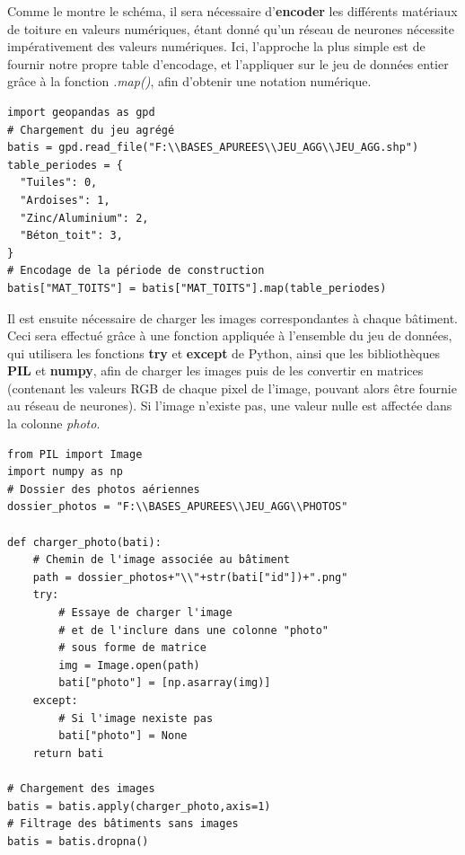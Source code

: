 \documentclass[
  11pt,
  french,
]{article}
\begin{document}
Comme le montre le schéma, il sera nécessaire d'\textbf{encoder} les
différents matériaux de toiture en valeurs numériques, étant donné qu'un
réseau de neurones nécessite impérativement des valeurs numériques. Ici,
l'approche la plus simple est de fournir notre propre table d'encodage,
et l'appliquer sur le jeu de données entier grâce à la fonction
\emph{.map()}, afin d'obtenir une notation numérique.

\begin{tcolorbox}[title= Encodage des matériaux de toiture ,colback=boitecode]
\begin{lstlisting}[style=code]
import geopandas as gpd
# Chargement du jeu agrégé
batis = gpd.read_file("F:\\BASES_APUREES\\JEU_AGG\\JEU_AGG.shp")
table_periodes = {
  "Tuiles": 0,
  "Ardoises": 1,
  "Zinc/Aluminium": 2,
  "Béton_toit": 3,
}
# Encodage de la période de construction
batis["MAT_TOITS"] = batis["MAT_TOITS"].map(table_periodes)\end{lstlisting}
\end{tcolorbox}

Il est ensuite nécessaire de charger les images correspondantes à chaque
bâtiment. Ceci sera effectué grâce à une fonction appliquée à l'ensemble
du jeu de données, qui utilisera les fonctions \textbf{try} et
\textbf{except} de Python, ainsi que les bibliothèques \textbf{PIL} et
\textbf{numpy}, afin de charger les images puis de les convertir en
matrices (contenant les valeurs RGB de chaque pixel de l'image, pouvant
alors être fournie au réseau de neurones). Si l'image n'existe pas, une
valeur nulle est affectée dans la colonne \emph{photo}.

\begin{tcolorbox}[title= Chargement des images ,colback=boitecode]
\begin{lstlisting}[style=code]
from PIL import Image
import numpy as np
# Dossier des photos aériennes
dossier_photos = "F:\\BASES_APUREES\\JEU_AGG\\PHOTOS"

def charger_photo(bati):
    # Chemin de l'image associée au bâtiment
    path = dossier_photos+"\\"+str(bati["id"])+".png"
    try:
        # Essaye de charger l'image
        # et de l'inclure dans une colonne "photo"
        # sous forme de matrice
        img = Image.open(path)
        bati["photo"] = [np.asarray(img)]
    except:
        # Si l'image nexiste pas
        bati["photo"] = None
    return bati

# Chargement des images
batis = batis.apply(charger_photo,axis=1)
# Filtrage des bâtiments sans images
batis = batis.dropna()\end{lstlisting}
\end{tcolorbox}
\end{document}
